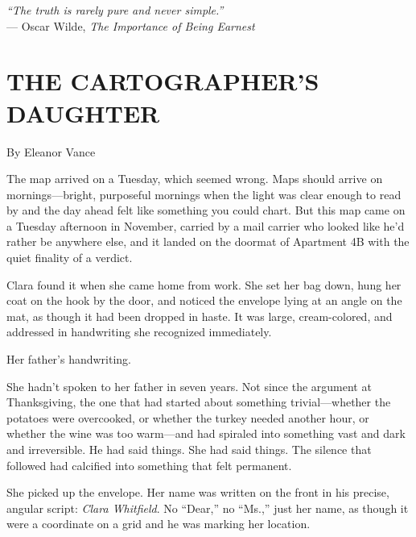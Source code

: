 \documentclass[
    language=english,
    doctype=short-story,
    institution=none,
]{../../omnilatex}
\begin{document}
\maketitle

\vspace{1cm}

\begin{center}
\textit{``The truth is rarely pure and never simple.''}\\
--- Oscar Wilde, \textit{The Importance of Being Earnest}
\end{center}

\vspace{1cm}

\section*{THE CARTOGRAPHER'S DAUGHTER}

\noindent By Eleanor Vance

\vspace{0.5cm}

The map arrived on a Tuesday, which seemed wrong. Maps should arrive on mornings---bright, purposeful mornings when the light was clear enough to read by and the day ahead felt like something you could chart. But this map came on a Tuesday afternoon in November, carried by a mail carrier who looked like he'd rather be anywhere else, and it landed on the doormat of Apartment 4B with the quiet finality of a verdict.

Clara found it when she came home from work. She set her bag down, hung her coat on the hook by the door, and noticed the envelope lying at an angle on the mat, as though it had been dropped in haste. It was large, cream-colored, and addressed in handwriting she recognized immediately.

Her father's handwriting.

She hadn't spoken to her father in seven years. Not since the argument at Thanksgiving, the one that had started about something trivial---whether the potatoes were overcooked, or whether the turkey needed another hour, or whether the wine was too warm---and had spiraled into something vast and dark and irreversible. He had said things. She had said things. The silence that followed had calcified into something that felt permanent.

She picked up the envelope. Her name was written on the front in his precise, angular script: \textit{Clara Whitfield}. No ``Dear,'' no ``Ms.,'' just her name, as though it were a coordinate on a grid and he was marking her location.
\end{document}

